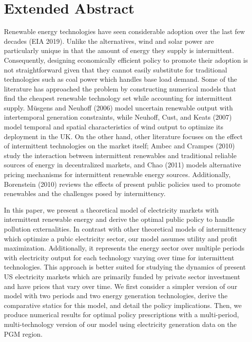 \documentclass[12pt,a4paper]{extarticle}
\begin{document}
	
\title{}

\author[]{Saketh Aleti}

\affil[]{\small{}}

\date{\vspace{-1em}\small{\today}}

\maketitle

\section{Extended Abstract}

Renewable energy technologies have seen considerable adoption over the last few decades (EIA 2019). Unlike the alternatives, wind and solar power are particularly unique in that the amount of energy they supply is intermittent. Consequently, designing economically efficient policy to promote their adoption is not straightforward given that they cannot easily substitute for traditional technologies such as coal power which handles base load demand. Some of the literature has approached the problem by constructing numerical models that find the cheapest renewable technology set while accounting for intermittent supply. Müsgens and Neuhoff (2006) model uncertain renewable output with intertemporal generation constraints, while Neuhoff, Cust, and Keats (2007) model temporal and spatial characteristics of wind output to optimize its deployment in the UK. On the other hand, other literature focuses on the effect of intermittent technologies on the market itself; Ambec and Crampes (2010) study the interaction between intermittent renewables and traditional reliable sources of energy in decentralized markets, and Chao (2011) models alternative pricing mechanisms for intermittent renewable energy sources. Additionally, Borenstein (2010) reviews the effects of present public policies used to promote renewables and the challenges posed by intermittency. 

In this paper, we present a theoretical model of electricity markets with intermittent renewable energy and derive the optimal public policy to handle pollution externalities. In contrast with other theoretical models of intermittency which optimize a pubic electricity sector, our model assumes utility and profit maximization. Additionally, it represents the energy sector over multiple periods with electricity output for each technology varying over time for intermittent technologies. This approach is better suited for studying the dynamics of present US electricity markets which are primarily funded by private sector investment and have prices that vary over time. We first consider a simpler version of our model with two periods and two energy generation technologies, derive the comparative statics for this model, and detail the policy implications. Then, we produce numerical results for optimal policy prescriptions with a multi-period, multi-technology version of our model using electricity generation data on the PGM region.
\end{document}
